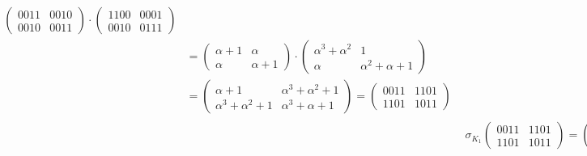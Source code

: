 \documentclass[fleqn]{article}
\begin{document}
\begin{equation*}
\begin{aligned}
\begin{aligned}
\begin{pmatrix}
                    0011 & 0010 \\
                    0010 & 0011
                \end{pmatrix} \cdot
                \begin{pmatrix}
                    1100 & 0001 \\
                    0010 & 0111
                \end{pmatrix} \\ &= 
                 \begin{pmatrix}
                    \alpha + 1 & \alpha \\
                    \alpha & \alpha + 1
                 \end{pmatrix} \cdot
                    \begin{pmatrix} 
                        \alpha^3 + \alpha^2 & 1 \\
                        \alpha & \alpha^2 + \alpha + 1
                    \end{pmatrix} \\ &=
                    \begin{pmatrix}
                        \alpha + 1 & \alpha^3 + \alpha^2 + 1 \\
                        \alpha^3 + \alpha^2 + 1 & \alpha^3 + \alpha + 1
                    \end{pmatrix} = 
                    \begin{pmatrix}
                        0011 & 1101 \\
                        1101 & 1011
                    \end{pmatrix}
            \end{aligned} \\
            &\sigma_{K_1} \begin{pmatrix}
                0011 & 1101 \\
                1101 & 1011
            \end{pmatrix} =
            \begin{pmatrix}
                0011 & 1101 \\
                1101 & 1011
            \end{pmatrix} +
            \begin{pmatrix}
                0011 & 1110 \\
                0110 & 1011
            \end{pmatrix} =
            \begin{pmatrix}
                0000 & 0011 \\

\end{pmatrix}
\end{aligned}
\end{equation*}
\end{document}
